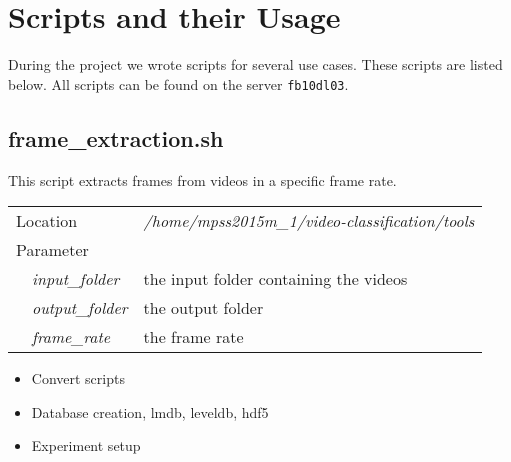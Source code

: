\section{Scripts and their Usage}
\label{sec:scripts}

During the project we wrote scripts for several use cases.
These scripts are listed below.
All scripts can be found on the server \texttt{fb10dl03}.

\subsection{frame\_extraction.sh}
This script extracts frames from videos in a specific frame rate.

\begin{table}[ht]
\begin{tabular}{lll}
\multicolumn{2}{l}{Location}  & \textit{/home/mpss2015m\_1/video-classification/tools} \\
\multicolumn{2}{l}{Parameter} &                                        \\
        & \textit{input\_folder}       & the input folder containing the videos \\
        & \textit{output\_folder}      & the output folder                      \\
        & \textit{frame\_rate}         & the frame rate
\end{tabular}
\end{table}



\begin{itemize}
	\item Convert scripts
	\item Database creation, lmdb, leveldb, hdf5
	\item Experiment setup
\end{itemize}
